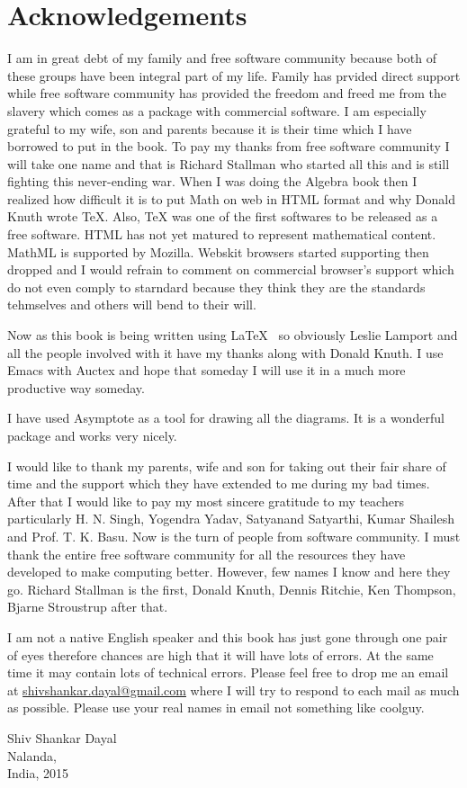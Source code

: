 \section*{Acknowledgements}
I am in great debt of my family and free software community because both of
these groups have been integral part of my life. Family has prvided direct
support while free software community has provided the freedom and freed me
from the slavery which comes as a package with commercial software. I am
especially grateful to my wife, son and parents because it is their time which
I have borrowed to put in the book. To pay my thanks from free software
community  I will take one name and that is Richard Stallman who started all
this  and is still fighting this never-ending war. When I was doing the Algebra
book then I realized how difficult it is to put Math on web in HTML format and
why Donald Knuth wrote \TeX{}. Also, \TeX{} was one of the first softwares to
be released as a free software. HTML has not yet matured to represent
mathematical content. MathML is supported by Mozilla. Webskit browsers started
supporting  then dropped and I would refrain to comment on commercial browser's
support which do not even comply to starndard because they think they are the
standards tehmselves and others will bend to their will.

Now as this book is being written using \LaTeX{}~ so obviously Leslie Lamport
and all the people involved with it have my thanks along with Donald Knuth. I
use Emacs with Auctex and hope that someday I will use it in a much more
productive way someday.

I have used Asymptote as a tool for drawing all the diagrams. It is a wonderful
package and works very nicely.

I would like to thank my parents, wife and son for taking out their fair share
of time and the support which they have extended to me during my bad
times. After that I would like to pay my most sincere gratitude to my teachers
particularly H. N. Singh, Yogendra Yadav, Satyanand Satyarthi, Kumar Shailesh
and Prof. T. K. Basu. Now is the turn of people from software community. I must
thank the entire free software community for all the resources they have
developed to make computing better. However, few names I know and here they
go. Richard Stallman is the first, Donald Knuth, Dennis Ritchie, Ken Thompson,
Bjarne Stroustrup after that.

I am not a native English speaker and this book has just gone through one pair
of eyes therefore chances are high that it will have lots of errors. At the
same time it may contain lots of technical errors. Please feel free to drop me
an email at
\href{mailto:shivshankar.dayal@gmail.com}{shivshankar.dayal@gmail.com} where I
will try to respond to each mail as
much as possible. Please use your real names in email not something like
coolguy.
\begin{flushright}
Shiv Shankar Dayal\\
Nalanda,\\
India, 2015
\end{flushright}
